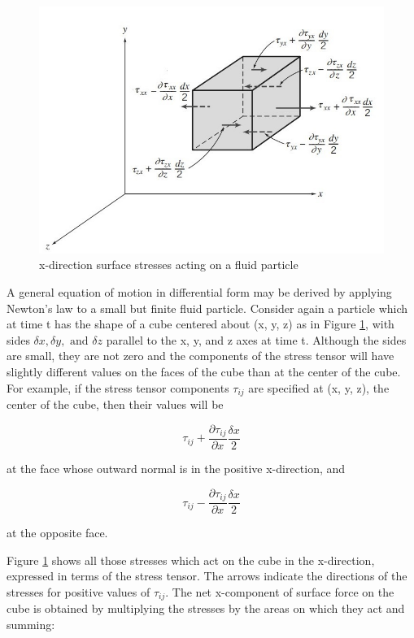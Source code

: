 \documentclass{article}
\begin{document}
{\begin{figure}[h!]
\centering
\includegraphics[scale=.9]{x-direction surface stresses acting on a fluid particle.jpg}
\caption{x-direction surface stresses acting on a fluid particle}
\label{fig:x_dir_surf_stress}
\end{figure}

A general equation of motion in differential form may be derived by applying Newton's law to a small but finite fluid particle. Consider again a particle which at time t has the shape of a cube centered about (x, y, z) as in Figure \ref{fig:x_dir_surf_stress}, with sides $\delta x, \delta y, \text{ and } \delta z$ parallel to the x, y, and z axes at time t. Although the sides are small, they are not zero and the components of the stress tensor will have slightly different values on the faces of the cube than at the center of the cube. For example, if the stress tensor components $\tau_{ij}$ are specified at (x, y, z), the center of the cube, then their values will be

$$\tau_{ij} + \frac{\partial \tau_{ij}}{\partial x}\frac{\delta x}{2}$$

at the face whose outward normal is in the positive x-direction, and

$$\tau_{ij} - \frac{\partial \tau_{ij}}{\partial x}\frac{\delta x}{2}$$

at the opposite face.

Figure \ref{fig:x_dir_surf_stress} shows all those stresses which act on the cube in the x-direction, expressed in terms of the stress tensor. The arrows indicate the directions of the stresses for positive values of $\tau_{ij}$. The net x-component of surface force on the cube is obtained by multiplying the stresses by the areas on which they act and summing:

}
\end{document}
